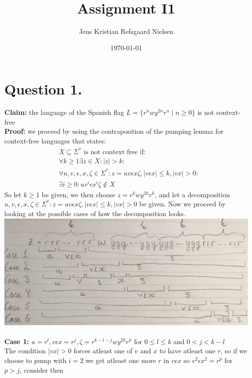 \documentclass{article}
\theoremstyle{remark}
\numberwithin{equation}{section}
\begin{document}
	\author{Jens Kristian Refsgaard Nielsen}
	\title{Assignment I1}
	\date{\today}
	\maketitle
\section*{Question 1.}
\textbf{Claim: } the language of the Spanish flag $L = \{ r^n w y^{2n} r^n \mid n\geq 0 \}$ is not context-free\\
\textbf{Proof: } we proceed by using the contraposition of the pumping lemma for context-free languages that states:
\begin{align*}
	&X\subseteq \Sigma^* \text{ is not context free if:}\\
	&\forall k\geq 1 \exists z \in X : |z|>k:\\
	&\forall u,v,\epsilon,x,\zeta\in\Sigma^* : z=uv\epsilon x\zeta, |v\epsilon x|\leq k, |vx|>0:\\
	&\exists i\geq 0 : uv^i\epsilon x^i \zeta \notin X 
\end{align*}
So let $k\geq 1$ be given, we then choose $z=r^k w y^{2k} r^k$, and let a decomposition $u,v,\epsilon,x,\zeta\in\Sigma^* : z=uv\epsilon x\zeta, |v\epsilon x|\leq k, |vx|>0$ be given. Now we proceed by looking at the possible cases of how the decomposition looks.\\
\includegraphics[scale=0.13]{cases}\\
\\\textbf{Case 1:} $u = r^l, v\epsilon x = r^j, \zeta = r^{k-l-j}w y^{2k}r^k$ for $0\leq l\leq k$ and $0<j<k-l$\\
The condition $|vx|>0$ forces atleast one of $v$ and $x$ to have atleast one $r$, so if we choose to pump with $i = 2$ we get atleast one more $r$ in $v\epsilon x$ so $v^2\epsilon x^2 = r^p$ for $p>j$, consider then
\end{document}
